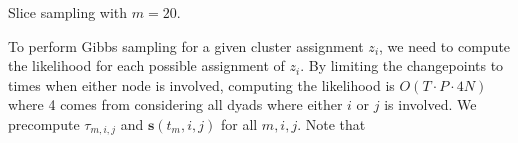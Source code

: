 \documentclass[11pt]{article}
\begin{document}

Slice sampling with $m=20$.

 To perform Gibbs sampling for a given cluster assignment $z_i$, we need to compute the likelihood for each possible assignment of $z_i$.   By limiting the changepoints to times when either node is involved, computing the likelihood is $O(T \cdot P \cdot 4N)$ where 4 comes from considering all dyads where either $i$ or $j$ is involved.  We precompute $\tau_{m,i,j}$ and $\mathbf{s}(t_m,i,j)$ for all $m,i,j$.  Note that 



\end{document}
